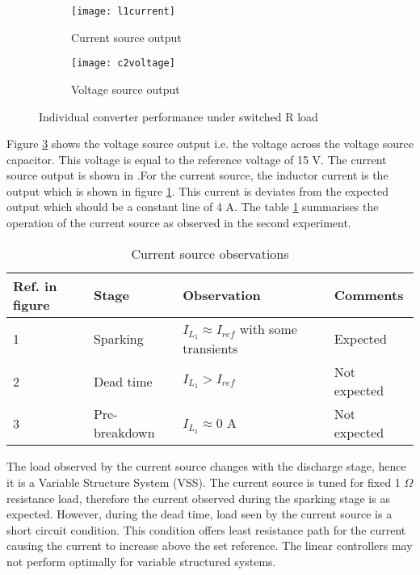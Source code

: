 	\begin{figure}[H]
		\centering
		\begin{subfigure}{0.49\textwidth}	
			\texttt{[image: l1current]}
			\caption{Current source output}
			\label{fig:l1current}
		\end{subfigure}
		\begin{subfigure}{0.49\textwidth}
			\texttt{[image: c2voltage]}
			\caption{Voltage source output}
			\label{fig:c2voltage}
		\end{subfigure}
		\caption{Individual converter performance under switched R load}
	\end{figure}
	
	Figure \ref{fig:c2voltage} shows the voltage source output i.e. the voltage across the voltage source capacitor. This voltage is equal to the reference voltage of 15 V. The current source output is shown in .For the current source, the inductor current is the output which is shown in figure \ref{fig:l1current}. This current is deviates from the expected output which should be a constant line of 4 A. The table \ref{tab:l1current} summarises the operation of the current source as observed in the second experiment.
	\begin{table}[H]
		\centering
		\begin{tabular}{|l|l|l|l|} \hline
		\textbf{Ref. in figure} & \textbf{Stage} & \textbf{Observation} & \textbf{Comments} \\ \hline
		1 & Sparking & $I_{L_1} \approx I_{ref}$ with some transients & Expected \\ \hline
		2 & Dead time & $I_{L_1} > I_{ref}$ & Not expected \\ \hline
		3 & Pre-breakdown & $I_{L_1} \approx 0$ A & Not expected \\ \hline
		\end{tabular} 
		\caption{Current source observations}
		\label{tab:l1current}
	\end{table}
	The load observed by the current source changes with the discharge stage, hence it is a Variable Structure System (VSS). The current source is tuned for fixed 1 $\Omega$ resistance load, therefore the current observed during the sparking stage is as expected. However, during the dead time, load seen by the current source is a short circuit condition. This condition offers least resistance path for the current causing the current to increase above the set reference. The linear controllers may not perform optimally for variable structured systems.
	
